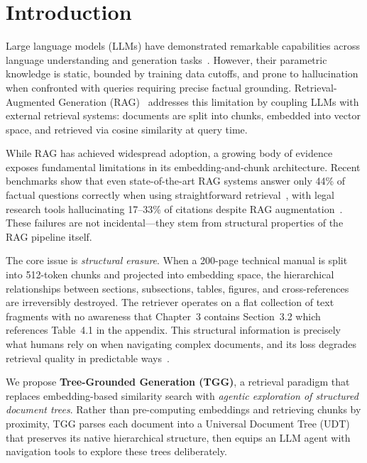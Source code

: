 \documentclass[conference]{IEEEtran}
\begin{document}
\section{Introduction}

Large language models (LLMs) have demonstrated remarkable capabilities across language understanding and generation tasks~\cite{brown2020gpt3, vaswani2017attention}. However, their parametric knowledge is static, bounded by training data cutoffs, and prone to hallucination when confronted with queries requiring precise factual grounding. Retrieval-Augmented Generation (RAG)~\cite{lewis2020rag} addresses this limitation by coupling LLMs with external retrieval systems: documents are split into chunks, embedded into vector space, and retrieved via cosine similarity at query time.

While RAG has achieved widespread adoption, a growing body of evidence exposes fundamental limitations in its embedding-and-chunk architecture. Recent benchmarks show that even state-of-the-art RAG systems answer only 44\% of factual questions correctly when using straightforward retrieval~\cite{yang2024crag}, with legal research tools hallucinating 17--33\% of citations despite RAG augmentation~\cite{dho2025legalrag}. These failures are not incidental---they stem from structural properties of the RAG pipeline itself.

The core issue is \textit{structural erasure}. When a 200-page technical manual is split into 512-token chunks and projected into embedding space, the hierarchical relationships between sections, subsections, tables, figures, and cross-references are irreversibly destroyed. The retriever operates on a flat collection of text fragments with no awareness that Chapter~3 contains Section~3.2 which references Table~4.1 in the appendix. This structural information is precisely what humans rely on when navigating complex documents, and its loss degrades retrieval quality in predictable ways~\cite{multidocfusion2025, reconstructchunking2025}.

We propose \textbf{Tree-Grounded Generation (TGG)}, a retrieval paradigm that replaces embedding-based similarity search with \textit{agentic exploration of structured document trees}. Rather than pre-computing embeddings and retrieving chunks by proximity, TGG parses each document into a Universal Document Tree (UDT) that preserves its native hierarchical structure, then equips an LLM agent with navigation tools to explore these trees deliberately.
\end{document}

